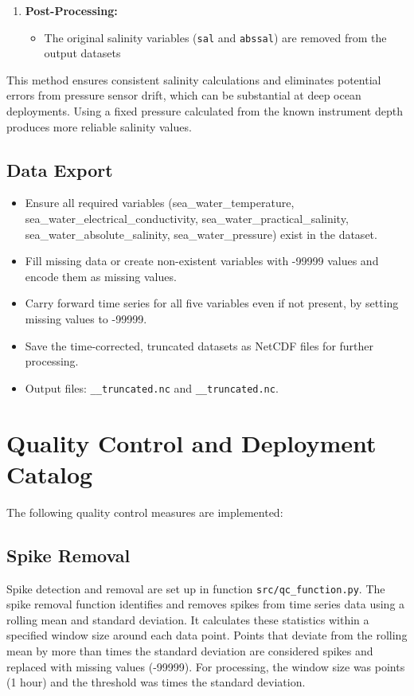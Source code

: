 \begin{enumerate}
    \item \textbf{Post-Processing:}
    \begin{itemize}
        \item The original salinity variables (\texttt{sal} and \texttt{abssal}) are removed from the output datasets
    \end{itemize}
\end{enumerate}

This method ensures consistent salinity calculations and eliminates potential errors from pressure sensor drift, 
which can be substantial at deep ocean deployments. 
Using a fixed pressure calculated from the known instrument depth produces more reliable salinity values.

\subsection{Data Export}

\begin{itemize}
\item Ensure all required variables (sea\_water\_temperature, sea\_water\_electrical\_conductivity, sea\_water\_practical\_salinity, sea\_water\_absolute\_salinity, sea\_water\_pressure) exist in the dataset.
\item Fill missing data or create non-existent variables with -99999 values and encode them as missing values.
\item Carry forward time series for all five variables even if not present, by setting missing values to -99999.
\item Save the time-corrected, truncated datasets as NetCDF files for further processing.
\item Output files: 
\texttt{\projectname\casenumber\_\FirstInstrument\_truncated.nc}
and \texttt{\projectname\casenumber\_\SecondInstrument\_truncated.nc}.
\end{itemize}


\section{Quality Control and Deployment Catalog}
The following quality control measures are implemented:

\subsection{Spike Removal}
Spike detection and removal are set up in function \texttt{src/qc\_function.py}. 
The spike removal function identifies and removes spikes from time series data using a rolling mean and standard deviation. 
It calculates these statistics within a specified window size around each data point. 
Points that deviate from the rolling mean by more than \ThresholdValue{} times the standard deviation are considered spikes and replaced with missing values (-99999). 
For \projectname{} \casenumber{} processing, the window size was \WindowSize{} points (1 hour) and the threshold was \ThresholdValue{} times the standard deviation.


